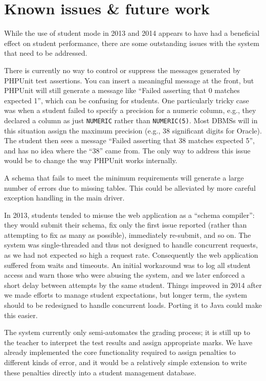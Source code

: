 \documentclass[sigconf, authordraft, capitalise]{acmart}
\begin{document}
\section{Known issues \& future work}
\label{sec-issues}

While the use of student mode in 2013 and 2014 appears to have had a beneficial effect on student performance, there are some outstanding issues with the system that need to be addressed.

There is currently no way to control or suppress the messages generated by PHPUnit test assertions. You can insert a meaningful message at the front, but PHPUnit will still generate a message like ``Failed asserting that 0 matches expected 1'', which can be confusing for students. One particularly tricky case was when a student failed to specify a precision for a numeric column, e.g., they declared a column as just \texttt{NUMERIC} rather than \texttt{NUMERIC(5)}. Most DBMSs will in this situation assign the maximum precision (e.g., 38 significant digits for Oracle). The student then sees a message ``Failed asserting that 38 matches expected 5'', and has no idea where the ``38'' came from. The only way to address this issue would be to change the way PHPUnit works internally.

A schema that fails to meet the minimum requirements will generate a large number of errors due to missing tables.  This could be alleviated by more careful exception handling in the main driver.

In 2013, students tended to misuse the web application as a ``schema compiler'': they would submit their schema, fix only the first issue reported (rather than attempting to fix as many as possible), immediately re-submit, and so on. The system was single-threaded and thus not designed to handle concurrent requests, as we had not expected so high a request rate. Consequently the web application suffered from waits and timeouts. An initial workaround was to log all student access and warn those who were abusing the system, and we later enforced a short delay between attempts by the same student. Things improved in 2014 after we made efforts to manage student expectations, but longer term, the system should to be redesigned to handle concurrent loads. Porting it to Java could make this easier.

The system currently only semi-automates the grading process; it is still up to the teacher to interpret the test results and assign appropriate marks. We have already implemented the core functionality required to assign penalties to different kinds of error, and it would be a relatively simple extension to write these penalties directly into a student management database.
\end{document}
